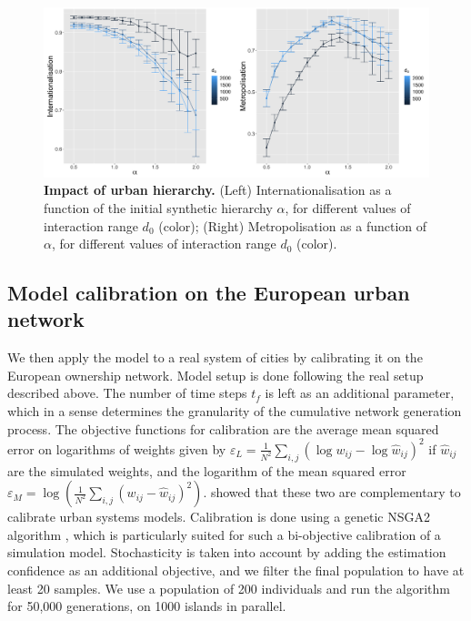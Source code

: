 \documentclass[10pt,letterpaper]{article}
\begin{document}
\begin{figure}
    \begin{center}
        \includegraphics[width=\linewidth]{figures/Fig7.png}
    \end{center}
    \vspace{2cm}
    \caption{\textbf{Impact of urban hierarchy.} (Left) Internationalisation as a function of the initial synthetic hierarchy $\alpha$, for different values of interaction range $d_0$ (color); (Right) Metropolisation as a function of $\alpha$, for different values of interaction range $d_0$ (color).\label{fig:fig7}}
\end{figure}



\subsection*{Model calibration on the European urban network}


We then apply the model to a real system of cities by calibrating it on the European ownership network. Model setup is done following the real setup described above. The number of time steps $t_f$ is left as an additional parameter, which in a sense determines the granularity of the cumulative network generation process. The objective functions for calibration are the average mean squared error on logarithms of weights given by $\varepsilon_L = \frac{1}{N^2} \sum_{i,j} \left(\log w_{ij} - \log \hat{w}_{ij} \right)^2$ if $\hat{w}_{ij}$ are the simulated weights, and the logarithm of the mean squared error $\varepsilon_M = \log\left(\frac{1}{N^2} \sum_{i,j} \left(w_{ij} - \hat{w}_{ij}\right)^2 \right)$. \cite{raimbault2018indirect} showed that these two are complementary to calibrate urban systems models. Calibration is done using a genetic NSGA2 algorithm \cite{deb2002fast}, which is particularly suited for such a bi-objective calibration of a simulation model. Stochasticity is taken into account by adding the estimation confidence as an additional objective, and we filter the final population to have at least 20 samples. We use a population of 200 individuals and run the algorithm for 50,000 generations, on 1000 islands in parallel.
\end{document}
